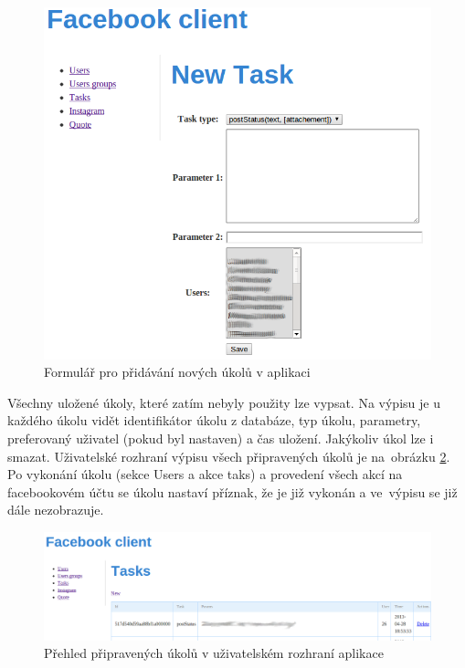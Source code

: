 \documentclass[thesis=M,czech]{FITthesis}[2013/05/10]
\begin{document}
\begin{figure}[h]
\begin{center}
\includegraphics[width=5in]{figures/fcNewTask.png}
\caption{Formulář pro přidávání nových úkolů v aplikaci}
\label{fig:fcNewTask}
\end{center}
\end{figure}

Všechny uložené úkoly, které zatím nebyly použity lze vypsat. Na výpisu je u každého úkolu vidět identifikátor úkolu z databáze, typ úkolu, parametry, preferovaný uživatel (pokud byl nastaven) a čas uložení. Jakýkoliv úkol lze i smazat. Uživatelské rozhraní výpisu všech připravených úkolů je na~obrázku \ref{fig:fcTasks}. Po vykonání úkolu (sekce Users a akce taks) a provedení všech akcí na facebookovém účtu se úkolu nastaví příznak, že je již vykonán a ve~výpisu se již dále nezobrazuje.

\begin{figure}[h]
\begin{center}
\includegraphics[width=5in]{figures/fcTasks.png}
\caption{Přehled připravených úkolů v uživatelském rozhraní aplikace}
\label{fig:fcTasks}
\end{center}
\end{figure}
\end{document}
